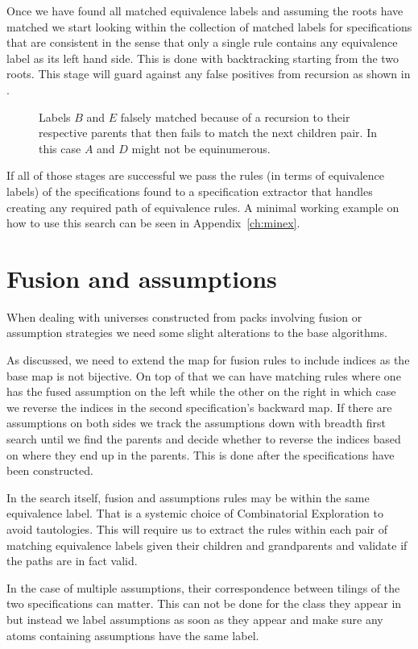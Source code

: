 Once we have found all matched equivalence labels and assuming the roots have matched we start looking within the collection of matched labels for specifications that are consistent in the sense that only a single rule contains any equivalence label as its left hand side. This is done with backtracking starting from the two roots. This stage will guard against any false positives from recursion as shown in .

\begin{figure}[ht!]
    \centering
    
    \caption{Labels $B$ and $E$ falsely matched because of a recursion to their respective parents that then fails to match the next children pair. In this case $A$ and $D$ might not be equinumerous.}
    \label{fig:recfalsepos}
\end{figure}

If all of those stages are successful we pass the rules (in terms of equivalence labels) of the specifications found to a specification extractor that handles creating any required path of equivalence rules. A minimal working example on how to use this search can be seen in Appendix~\ref{ch:minex}.


\section{Fusion and assumptions}
When dealing with universes constructed from packs involving fusion or assumption strategies we need some slight alterations to the base algorithms. 

As discussed, we need to extend the map for fusion rules to include indices as the base map is not bijective. On top of that we can have matching rules where one has the fused assumption on the left while the other on the right in which case we reverse the indices in the second specification's backward map. If there are assumptions on both sides we track the assumptions down with breadth first search until we find the parents and decide whether to reverse the indices based on where they end up in the parents. This is done after the specifications have been constructed.

In the search itself, fusion and assumptions rules may be within the same equivalence label. That is a systemic choice of Combinatorial Exploration to avoid tautologies. This will require us to extract the rules within each pair of matching equivalence labels given their children and grandparents and validate if the paths are in fact valid.

In the case of multiple assumptions, their correspondence between tilings of the two specifications can matter. This can not be done for the class they appear in but instead we label assumptions as soon as they appear and make sure any atoms containing assumptions have the same label.